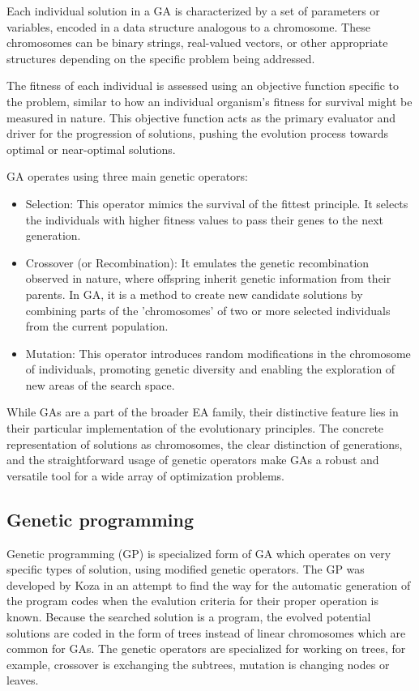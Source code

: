 \documentclass[twoside]{ctuthesis}
\theoremstyle{plain}
\theoremstyle{definition}
\theoremstyle{note}
\begin{document}
Each individual solution in a GA is characterized by a set of parameters or variables, encoded in a data structure analogous to a chromosome. These chromosomes can be binary strings, real-valued vectors, or other appropriate structures depending on the specific problem being addressed.

The fitness of each individual is assessed using an objective function specific to the problem, similar to how an individual organism's fitness for survival might be measured in nature. This objective function acts as the primary evaluator and driver for the progression of solutions, pushing the evolution process towards optimal or near-optimal solutions.

GA operates using three main genetic operators:
\begin{itemize}
	\item Selection: This operator mimics the survival of the fittest principle. It selects the individuals with higher fitness values to pass their genes to the next generation.
	\item Crossover (or Recombination): It emulates the genetic recombination observed in nature, where offspring inherit genetic information from their parents. In GA, it is a method to create new candidate solutions by combining parts of the 'chromosomes' of two or more selected individuals from the current population.
	\item Mutation: This operator introduces random modifications in the chromosome of individuals, promoting genetic diversity and enabling the exploration of new areas of the search space.
\end{itemize}

While GAs are a part of the broader EA family, their distinctive feature lies in their particular implementation of the evolutionary principles. The concrete representation of solutions as chromosomes, the clear distinction of generations, and the straightforward usage of genetic operators make GAs a robust and versatile tool for a wide array of optimization problems.

\subsection{Genetic programming}
Genetic programming (GP) is specialized form of GA which operates on very specific types of solution, using modified genetic operators. The GP was developed by Koza \cite{koza1992genetic} in an attempt to find the way for the automatic generation of the program codes when the evalution criteria for their proper operation is known. Because the searched solution is a program, the evolved potential solutions are coded in the form of trees instead of linear chromosomes which are common for GAs. The genetic operators are specialized for working on trees, for example, crossover is exchanging the subtrees, mutation is changing nodes or leaves.
\end{document}
